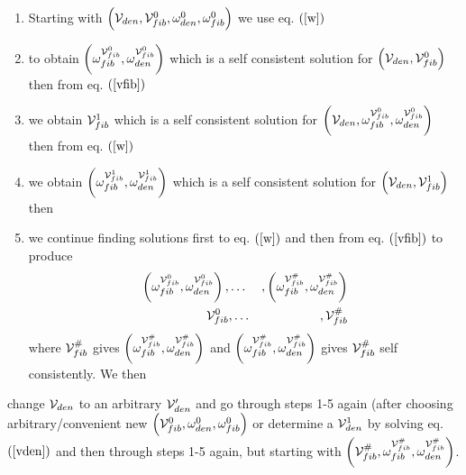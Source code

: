 \begin{enumerate}
\item Starting with $\left( {\cal V}_{den},{\cal V}_{fib}^{0},\omega
_{den}^{0},\omega _{fib}^{0}\right) $ we use eq. $\left( \ref{w}\right) $

\item to obtain $\left( {\cal \omega }_{fib}^{{\cal V}_{fib}^{0}},\omega
_{den}^{{\cal V}_{fib}^{0}}\right) $ which is a self consistent solution for 
$\left( {\cal V}_{den},{\cal V}_{fib}^{0}\right) $ then from eq. $\left( \ref%
{vfib}\right) $

\item we obtain ${\cal V}_{fib}^{1}$ which is a self consistent solution for 
$\left( {\cal V}_{den},{\cal \omega }_{fib}^{{\cal V}_{fib}^{0}},\omega
_{den}^{{\cal V}_{fib}^{0}}\right) $ then from eq. $\left( \ref{w}\right) $

\item we obtain $\left( {\cal \omega }_{fib}^{{\cal V}_{fib}^{1}},\omega
_{den}^{{\cal V}_{fib}^{1}}\right) $ which is a self consistent solution for 
$\left( {\cal V}_{den},{\cal V}_{fib}^{1}\right) $ then

\item we continue finding solutions first to eq. $\left( \ref{w}\right) $
and then from eq. $\left( \ref{vfib}\right) $ to produce 
\begin{eqnarray}
\left( {\cal \omega }_{fib}^{{\cal V}_{fib}^{0}},\omega _{den}^{{\cal V}%
_{fib}^{0}}\right) , &\ldots &,\left( {\cal \omega }_{fib}^{{\cal V}%
_{fib}^{\#}},\omega _{den}^{{\cal V}_{fib}^{\#}}\right) \\
{\cal V}_{fib}^{0} &,\ldots &,{\cal V}_{fib}^{\#}
\end{eqnarray}%
where ${\cal V}_{fib}^{\#}$ gives $\left( {\cal \omega }_{fib}^{{\cal V}%
_{fib}^{\#}},\omega _{den}^{{\cal V}_{fib}^{\#}}\right) $ and $\left( {\cal %
\omega }_{fib}^{{\cal V}_{fib}^{\#}},\omega _{den}^{{\cal V}%
_{fib}^{\#}}\right) $ gives ${\cal V}_{fib}^{\#}$ self consistently. We then
\end{enumerate}

change ${\cal V}_{den}$ to an arbitrary ${\cal V}_{den}^{\prime }$ and go
through steps 1-5 again (after choosing arbitrary/convenient new $\left( 
{\cal V}_{fib}^{0},\omega _{den}^{0},\omega _{fib}^{0}\right) $ or determine
a ${\cal V}_{den}^{1}$ by solving eq. $\left( \ref{vden}\right) $ and then
through steps 1-5 again, but starting with $\left( {\cal V}_{fib}^{\#},{\cal %
\omega }_{fib}^{{\cal V}_{fib}^{\#}},\omega _{den}^{{\cal V}%
_{fib}^{\#}}\right) $.


